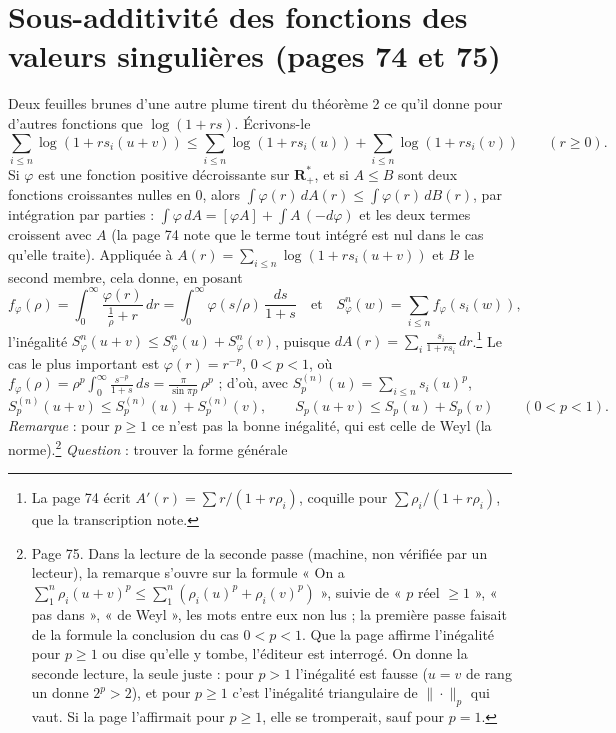 \documentclass[11pt,a4paper]{article}
\begin{document}
\section*{Sous-additivité des fonctions des valeurs singulières (pages 74 et 75)}

Deux feuilles brunes d'une autre plume tirent du théorème 2 ce qu'il donne
pour d'autres fonctions que $\log(1+rs)$. Écrivons-le
\[
  \sum_{i \leq n} \log(1 + r s_i(u+v)) \leq \sum_{i \leq n} \log(1 + r s_i(u))
  + \sum_{i \leq n} \log(1 + r s_i(v)) \qquad (r \geq 0) .
\]
Si $\varphi$ est une fonction positive décroissante sur $\mathbf{R}^{*}_{+}$,
et si $A \leq B$ sont deux fonctions croissantes nulles en $0$, alors
$\int \varphi(r)\,dA(r) \leq \int \varphi(r)\,dB(r)$, par intégration par
parties : $\int \varphi\,dA = [\varphi A] + \int A\,(-d\varphi)$ et les deux
termes croissent avec $A$ (la page 74 note que le terme tout intégré est nul
dans le cas qu'elle traite). Appliquée à $A(r) = \sum_{i \leq n} \log(1 +
r s_i(u+v))$ et $B$ le second membre, cela donne, en posant
\[
  f_\varphi(\rho) = \int_0^{\infty} \frac{\varphi(r)}{\frac{1}{\rho} + r}\,dr
  = \int_0^{\infty} \varphi(s/\rho)\,\frac{ds}{1+s}
  \quad\text{et}\quad
  S^n_\varphi(w) = \sum_{i \leq n} f_\varphi(s_i(w)),
\]
l'inégalité $S^n_\varphi(u+v) \leq S^n_\varphi(u) + S^n_\varphi(v)$, puisque
$dA(r) = \sum_i \frac{s_i}{1 + r s_i}\,dr$.\footnote{La page 74 écrit
$A'(r) = \sum r/(1 + r\rho_i)$, coquille pour $\sum \rho_i/(1 + r\rho_i)$,
que la transcription note.} Le cas le plus important est $\varphi(r) =
r^{-p}$, $0 < p < 1$, où $f_\varphi(\rho) = \rho^p \int_0^\infty
\frac{s^{-p}}{1+s}\,ds = \frac{\pi}{\sin \pi p}\,\rho^p$ ; d'où, avec
$S^{(n)}_p(u) = \sum_{i \leq n} s_i(u)^p$,
\[
  S^{(n)}_p(u+v) \leq S^{(n)}_p(u) + S^{(n)}_p(v), \qquad
  S_p(u+v) \leq S_p(u) + S_p(v) \qquad (0 < p < 1) .
\]
\emph{Remarque} : pour $p \geq 1$ ce n'est pas la bonne inégalité, qui est
celle de Weyl (la norme).\footnote{Page 75. Dans la lecture de la seconde
passe (machine, non vérifiée par un lecteur), la remarque s'ouvre sur la
formule « On a $\sum_1^n \rho_i(u+v)^p \leq \sum_1^n (\rho_i(u)^p +
\rho_i(v)^p)$ », suivie de « $p$ réel $\geq 1$ », « pas dans », « de Weyl »,
les mots entre eux non lus ; la première passe faisait de la formule la
conclusion du cas $0 < p < 1$. Que la page affirme l'inégalité pour $p \geq
1$ ou dise qu'elle y tombe, l'éditeur est interrogé. On donne la seconde
lecture, la seule juste : pour $p > 1$ l'inégalité est fausse ($u = v$ de rang
un donne $2^p > 2$), et pour $p \geq 1$ c'est l'inégalité triangulaire de
$\|\cdot\|_p$ qui vaut. Si la page l'affirmait pour $p \geq 1$, elle se
tromperait, sauf pour $p = 1$.} \emph{Question} : trouver la forme générale
\end{document}
